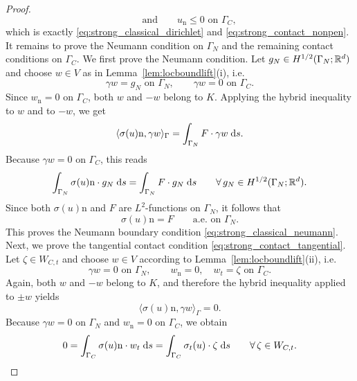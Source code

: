 \begin{proof}
\begin{equation*}
		\qquad\text{and}\qquad
		u_{\mathrm n}\le 0 \text{ on }\Gamma_C,
	\end{equation*}
	which is exactly \eqref{eq:strong_classical_dirichlet} and \eqref{eq:strong_contact_nonpen}. It remains to prove the Neumann condition on $\Gamma_N$ and the remaining contact conditions on $\Gamma_C$. We first prove the Neumann condition. Let $g_N\in H^{1/2}(\Gamma_N;{\mathbb R}^d)$ and choose $w\in V$ as in Lemma~\ref{lem:locboundlift}(i), i.e.
	\begin{equation*}
		\gamma w=g_N \text{ on }\Gamma_N,
		\qquad
		\gamma w=0 \text{ on }\Gamma_C.
	\end{equation*}
	Since $w_{\mathrm n}=0$ on $\Gamma_C$, both $w$ and $-w$ belong to $K$. Applying the hybrid inequality to $w$ and to $-w$, we get
	\begin{equation*}
		\langle \sigma(u)\mathrm n,\gamma w\rangle_\Gamma
		=
		\int_{\Gamma_N} F\cdot \gamma w\;{{\mathrm{d}} s}.
	\end{equation*}
	Because $\gamma w=0$ on $\Gamma_C$, this reads
	\begin{equation*}
		\int_{\Gamma_N} \sigma(u)\mathrm n\cdot g_N\;{{\mathrm{d}} s}
		=
		\int_{\Gamma_N} F\cdot g_N\;{{\mathrm{d}} s}
		\qquad\forall\,g_N\in H^{1/2}(\Gamma_N;{\mathbb R}^d).
	\end{equation*}
	Since both $\sigma(u)\mathrm n$ and $F$ are $L^2$-functions on $\Gamma_N$, it follows that
	\begin{equation*}
		\sigma(u)\mathrm n = F
		\qquad\text{a.e. on }\Gamma_N.
	\end{equation*}
	This proves the Neumann boundary condition \eqref{eq:strong_classical_neumann}. Next, we prove the tangential contact condition \eqref{eq:strong_contact_tangential}. Let $\zeta\in W_{C,t}$ and choose $w\in V$ according to Lemma~\ref{lem:locboundlift}(ii), i.e.
	\begin{equation*}
		\gamma w=0 \text{ on }\Gamma_N,
		\qquad
		w_{\mathrm n}=0,\quad w_t=\zeta \text{ on }\Gamma_C.
	\end{equation*}
	Again, both $w$ and $-w$ belong to $K$, and therefore the hybrid inequality applied to $\pm w$ yields
	\begin{equation*}
		\langle \sigma(u)\mathrm n,\gamma w\rangle_\Gamma = 0.
	\end{equation*}
	Because $\gamma w=0$ on $\Gamma_N$ and $w_{\mathrm n}=0$ on $\Gamma_C$, we obtain
	\begin{equation*}
		0
		=
		\int_{\Gamma_C} \sigma(u)\mathrm n\cdot w_t\;\ds
		=
		\int_{\Gamma_C} \sigma_t(u)\cdot \zeta\;\ds
		\qquad\forall\,\zeta\in W_{C,t}.

\end{equation*}
\end{proof}
